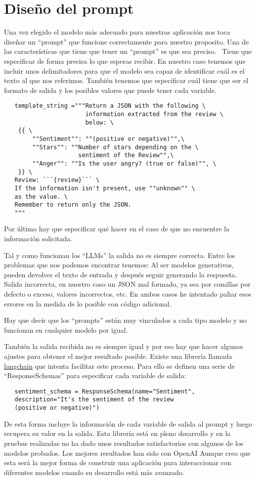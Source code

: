 \section{Diseño del prompt}
Una vez elegido el modelo más adecuado para nuestras aplicación nos toca diseñar un ``prompt'' 
que funcione correctamente para nuestro proposito.
Una de las características que tiene que tener un ``prompt'' es que sea preciso.~\cite{white2023prompt}
Tiene que especificar de forma precisa lo que esperas recibir.
En nuestro caso tenemos que incluir unos delimitadores para que el modelo sea capaz de identificar 
cuál es el texto al que nos referimos.
También tenemos que especificar cuál tiene que ser el formato de salida y los posibles 
valores que puede tener cada variable.
\begin{verbatim}
   template_string ="""Return a JSON with the following \
                       information extracted from the review \
                       below: \
    {{ \
        ""Sentiment"": ""(positive or negative)"",\
        ""Stars"": ""Number of stars depending on the \
                     sentiment of the Review"",\
        ""Anger"": ""Is the user angry? (true or false)"", \
    }} \
   Review: ```{review}``` \
   If the information isn't present, use ""unknown"" \
   as the value. \
   Remember to return only the JSON. 
   """
\end{verbatim}
Por último hay que especificar qué hacer en el caso de que 
no encuentre la información solicitada.

Tal y como funcionan los ``LLMs'' la salida no es siempre correcta. 
Entre los problemas que nos podemos encontrar tenemos:
   Al ser modelos generativos, pueden devolver el texto de entrada y después seguir generando la respuesta.
   Salida incorrecta, en nuestro caso un JSON mal formado, ya sea por comillas por defecto o exceso, valores incorrectos, etc.
En ambos casos he intentado paliar esos errores en la medida de lo posible con código adicional.

Hay que decir que los ``prompts'' están muy vinculados a cada tipo 
modelo y no funcionan en cualquier modelo por igual.

También la salida recibida no es siempre igual y por eso hay que hacer
algunos ajustes para obtener el mejor resultado posible.
Existe una librería llamada \href{https://python.langchain.com/docs/get_started/introduction}{langchain} que intenta facilitar este proceso.
Para ello se definen una serie de ``ResponseSchemas'' para especificar cada variable de salida:
\begin{verbatim}
   sentiment_schema = ResponseSchema(name="Sentiment",
   description="It's the sentiment of the review 
   (positive or negative)") 
\end{verbatim}
De esta forma incluye la información de cada variable de salida al prompt y luego recupera su valor en la salida.
Esta librería está en pleno desarrollo y en la pruebas realizadas no ha dado unos resultados satisfactorios 
con algunos de los modelos probados. Los mejores resultados han sido con OpenAI
Aunque creo que esta será la mejor forma de construir una aplicación para interaccionar con diferentes modelos 
cuando su desarrollo está más avanzado.


